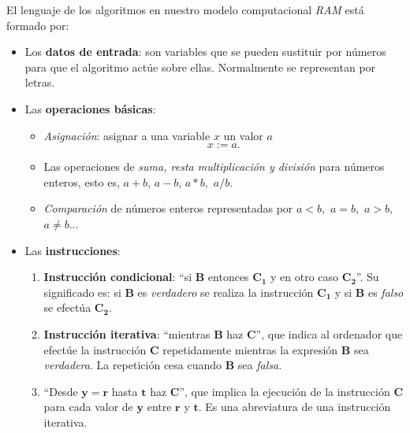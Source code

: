 \documentclass[twoside]{report}
\newcommand{\bs}[1]{\boldsymbol{#1}}
\begin{document}
El lenguaje de los algoritmos en nuestro modelo computacional \emph{RAM} est\'{a} formado por:
 \begin{itemize}
   \item Los \textbf{datos de entrada}: son variables que se pueden sustituir por n\'{u}meros para que el algoritmo act\'{u}e sobre ellas. Normalmente se representan por letras.
   \item Las \textbf{operaciones b\'{a}sicas}:
    \begin{itemize}
      \item \emph{Asignaci\'{o}n}: asignar a una variable $x$ un valor $a$ $$x:=a.$$
      \item Las operaciones de \emph{suma, resta multiplicaci\'{o}n y divisi\'{o}n} para n\'{u}meros enteros, esto es, $a+b$, $a-b$,
            $a*b,$ $a/b.$
      \item \emph{Comparaci\'{o}n} de n\'{u}meros enteros representadas por $a<b,$ $a=b,$ $a>b,$ $a\neq b$...
    \end{itemize}
   \item Las \textbf{instrucciones}:
      \begin{enumerate}
        \item \textbf{Instrucci\'{o}n condicional}: ``\textsf{si} $\bs{B}$ \textsf{entonces} $\bs{C_1}$ \textsf{y en otro caso} $\bs{C_2}$''. Su significado es: si $\bs{B}$ es \emph{verdadero} se realiza la instrucci\'{o}n $\bs{C_1}$ y si $\bs{B}$ es \emph{falso} se efect\'{u}a $\bs{C_2}$.
        \item \textbf{Instrucci\'{o}n iterativa}: ``\textsf{mientras} $\bs{B}$ \textsf{haz}  $\bs{C}$'', que indica al ordenador que efect\'{u}e la instrucci\'{o}n $\bs{C}$ repetidamente mientras la expresi\'{o}n $\bs{B}$ sea \emph{verdadera}. La repetici\'{o}n cesa cuando $\bs{B}$ sea \emph{falsa}.
        \item ``\textsf{Desde} $\bs{y=r}$ \textsf{hasta} $\bs{t}$ \textsf{haz} $\bs{C}$'', que implica la ejecuci\'{o}n de la ins\-truc\-ci\'{o}n $\bs{C}$ para cada valor de $\bs{y}$ entre $\bs{r}$ y $\bs{t}$. Es una abreviatura de una instrucci\'{o}n iterativa.
      \end{enumerate}
 \end{itemize}
\end{document}
